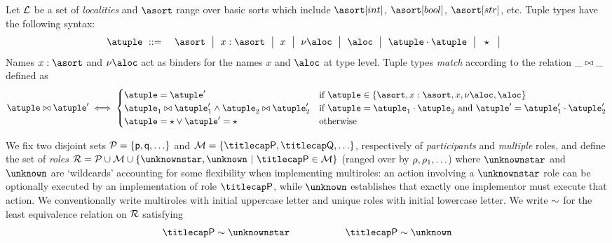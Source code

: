 %
Let $\mathcal{L}$ be a set of \emph{localities} and $\asort$ range over
basic sorts which include $\asort[int]$, $\asort[bool]$,
$\asort[str]$, etc.
%
Tuple types have the following syntax:
\begin{eqnarray*}
  \atuple & \bnfdef & \asort \bnfmid
                      x : \asort \bnfmid
                      x  \bnfmid
                      \nu \aloc \bnfmid
                      \aloc \bnfmid
                      \atuple \cdot \atuple \bnfmid
                      \wildcard \bnfmid
\end{eqnarray*}
Names $x : \asort$ and $\nu \aloc$ act as binders for the names $x$ and $\aloc$ at type level. 
%
Tuple types \emph{match} according to the relation $\_ \bowtie \_$
defined as
\[
  \atuple \matches \atuple' \iff
  \begin{cases}
    \atuple = \atuple'  
    & 
    \text{if $\atuple\in\{\asort, x : \asort, x, \nu \aloc, \aloc\}$}
    \\
    \atuple_1 \matches \atuple'_1
    \land \atuple_2 \matches \atuple'_2
    &
    \text{if } \atuple = \atuple_1 \cdot \atuple_2
    \text{ and }  \atuple' = \atuple'_1 \cdot \atuple'_2
    \\
    \atuple = \wildcard \vee \atuple' = \wildcard & \text{otherwise}
  \end{cases}
\]

%

We fix two disjoint sets $\participants = \{\ptp p, \ptp q, \ldots\}$
and $\multiroles = \{\amulti P, \amulti Q, \ldots \}$, respectively of
\emph{participants} and \emph{multiple} roles, and define the set of
\emph{roles} $\roleset = \participants \cup \multiroles \cup
\{\unknownstar, \unknown\ |\ \amulti P \in\multiroles\}$ (ranged over by
$\rho, \rho_1, \ldots$) where $\unknownstar$ and $\unknown$ are
`wildcards' accounting for some flexibility when implementing
multiroles: an action involving a $\unknownstar$ role can be
optionally executed by an implementation of role $\amulti P$, while
$\unknown$ establishes that exactly one implementor must execute that
action.
%
We conventionally write multiroles with initial uppercase letter and
unique roles with initial lowercase letter.
%
We write $\sim$ for the least equivalence relation on $\mathcal{R}$
satisfying
\[\amulti P \eqR \unknownstar \hspace{2cm} \amulti P \eqR \unknown\]



